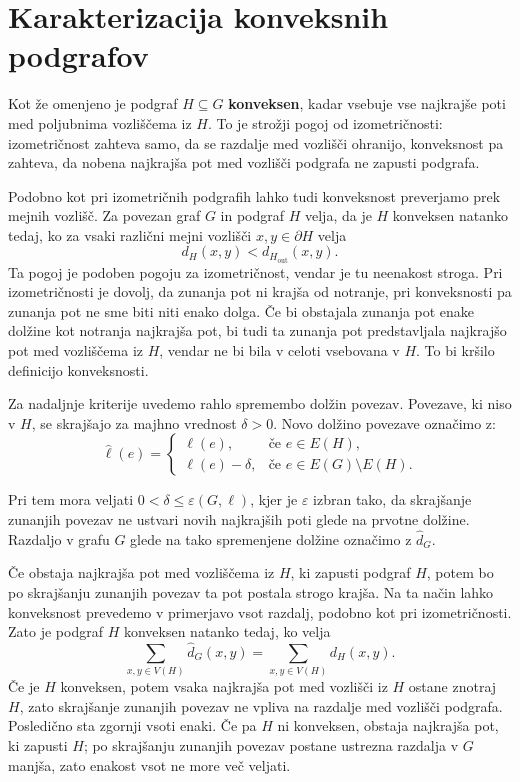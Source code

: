 \documentclass[sigconf
]{acmart}
\theoremstyle{definition}
\begin{document}
\section{Karakterizacija konveksnih podgrafov \cite{main_paper}}

Kot že omenjeno je podgraf $H \subseteq G$ \textbf{konveksen}, kadar vsebuje vse najkrajše poti med poljubnima vozliščema iz $H$. To je strožji pogoj od izometričnosti: izometričnost zahteva samo, da se razdalje med vozlišči ohranijo, konveksnost pa zahteva, da nobena najkrajša pot med vozlišči podgrafa ne zapusti podgrafa.

Podobno kot pri izometričnih podgrafih lahko tudi konveksnost preverjamo prek mejnih vozlišč. Za povezan graf $G$ in podgraf $H$ velja, da je $H$ konveksen natanko tedaj, ko za vsaki različni mejni vozlišči $x,y \in \partial H$ velja
\begin{equation}
    d_H(x,y) < d_{H_{\mathrm{out}}}(x,y).
\end{equation}
Ta pogoj je podoben pogoju za izometričnost, vendar je tu neenakost stroga. Pri izometričnosti je dovolj, da zunanja pot ni krajša od notranje, pri konveksnosti pa zunanja pot ne sme biti niti enako dolga. Če bi obstajala zunanja pot enake dolžine kot notranja najkrajša pot, bi tudi ta zunanja pot predstavljala najkrajšo pot med vozliščema iz $H$, vendar ne bi bila v celoti vsebovana v $H$. To bi kršilo definicijo konveksnosti.

Za nadaljnje kriterije uvedemo rahlo spremembo dolžin povezav. Povezave, ki niso v $H$, se skrajšajo za majhno vrednost $\delta > 0$. Novo dolžino povezave označimo z:
\begin{equation}
    \hat{\ell}(e) =
    \begin{cases}
        \ell(e), & \text{če } e \in E(H),\\
        \ell(e) - \delta, & \text{če } e \in E(G)\setminus E(H).
    \end{cases}
\end{equation}

Pri tem mora veljati \(0<\delta\le \varepsilon(G,\ell)\), kjer je \(\varepsilon\) izbran tako, da skrajšanje zunanjih povezav ne ustvari novih najkrajših poti glede na prvotne dolžine. Razdaljo v grafu $G$ glede na tako spremenjene dolžine označimo z $\hat{d}_G$.

Če obstaja najkrajša pot med vozliščema iz $H$, ki zapusti podgraf $H$, potem bo po skrajšanju zunanjih povezav ta pot postala strogo krajša. Na ta način lahko konveksnost prevedemo v primerjavo vsot razdalj, podobno kot pri izometričnosti. Zato je podgraf $H$ konveksen natanko tedaj, ko velja
\begin{equation}
    \sum_{x,y \in V(H)} \hat{d}_G(x,y)
    =
    \sum_{x,y \in V(H)} d_H(x,y).
\end{equation}
Če je $H$ konveksen, potem vsaka najkrajša pot med vozlišči iz $H$ ostane znotraj $H$, zato skrajšanje zunanjih povezav ne vpliva na razdalje med vozlišči podgrafa. Posledično sta zgornji vsoti enaki. Če pa $H$ ni konveksen, obstaja najkrajša pot, ki zapusti $H$; po skrajšanju zunanjih povezav postane ustrezna razdalja v $G$ manjša, zato enakost vsot ne more več veljati.
\end{document}
